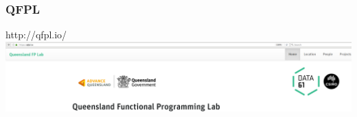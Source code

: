 \begin{frame}
\frametitle{QFPL}
\begin{block}{http://qfpl.io/}
\includegraphics[height=0.24\textheight]{image/qfpl-io.png}
\end{block}
\end{frame}





